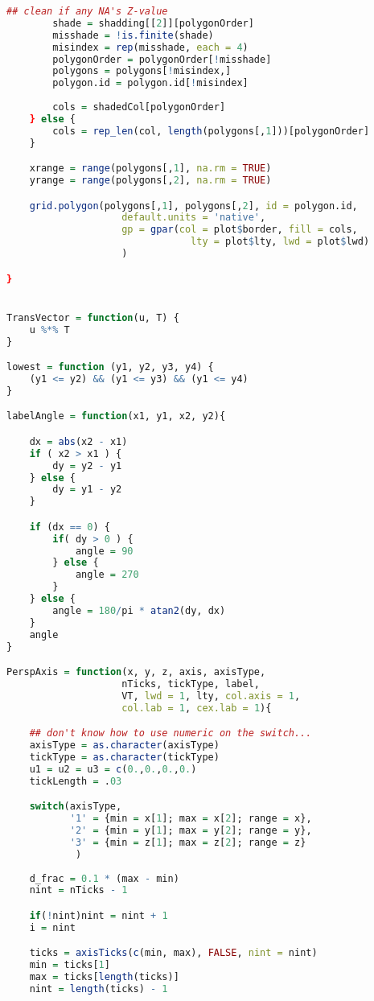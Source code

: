 \begin{lstlisting}[language = R]
        ## clean if any NA's Z-value
        shade = shadding[[2]][polygonOrder]
        misshade = !is.finite(shade)
        misindex = rep(misshade, each = 4)
        polygonOrder = polygonOrder[!misshade]
        polygons = polygons[!misindex,]
        polygon.id = polygon.id[!misindex]
        
        cols = shadedCol[polygonOrder]        
    } else {
        cols = rep_len(col, length(polygons[,1]))[polygonOrder]
    }

    xrange = range(polygons[,1], na.rm = TRUE)
    yrange = range(polygons[,2], na.rm = TRUE)

    grid.polygon(polygons[,1], polygons[,2], id = polygon.id,
                    default.units = 'native', 
                    gp = gpar(col = plot$border, fill = cols, 
                                lty = plot$lty, lwd = plot$lwd)
                    )

}


TransVector = function(u, T) {
    u %*% T
}

lowest = function (y1, y2, y3, y4) {
    (y1 <= y2) && (y1 <= y3) && (y1 <= y4)		
}

labelAngle = function(x1, y1, x2, y2){  

    dx = abs(x2 - x1)
    if ( x2 > x1 ) {
        dy = y2 - y1
    } else {
        dy = y1 - y2
    }

    if (dx == 0) {
        if( dy > 0 ) {
            angle = 90
        } else {
            angle = 270
        }
    } else {
        angle = 180/pi * atan2(dy, dx)
    }
    angle
}	

PerspAxis = function(x, y, z, axis, axisType, 
                    nTicks, tickType, label, 
                    VT, lwd = 1, lty, col.axis = 1,
                    col.lab = 1, cex.lab = 1){

    ## don't know how to use numeric on the switch...
    axisType = as.character(axisType)
    tickType = as.character(tickType)
    u1 = u2 = u3 = c(0.,0.,0.,0.)
    tickLength = .03

    switch(axisType,
           '1' = {min = x[1]; max = x[2]; range = x},
           '2' = {min = y[1]; max = y[2]; range = y},
           '3' = {min = z[1]; max = z[2]; range = z}
            )
            
    d_frac = 0.1 * (max - min)
    nint = nTicks - 1

    if(!nint)nint = nint + 1
    i = nint

    ticks = axisTicks(c(min, max), FALSE, nint = nint)
    min = ticks[1]
    max = ticks[length(ticks)]
    nint = length(ticks) - 1
            

\end{lstlisting}
